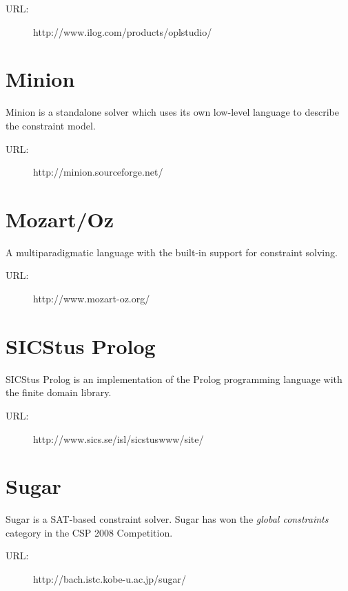 \begin{description}
	\item[URL:] http://www.ilog.com/products/oplstudio/
\end{description}

\section*{Minion}
Minion is a standalone solver which uses its own low-level language to describe the
constraint model. 

\begin{description}
	\item[URL:] http://minion.sourceforge.net/
\end{description}  

\section*{Mozart/Oz}
A multiparadigmatic language with the built-in support for constraint solving.

\begin{description}
	\item[URL:] http://www.mozart-oz.org/
\end{description}  

\section*{SICStus Prolog}
SICStus Prolog is an implementation of the Prolog programming language with the 
finite domain library.

\begin{description}
	\item[URL:] http://www.sics.se/isl/sicstuswww/site/
\end{description}  

\section*{Sugar}
Sugar is a SAT-based constraint solver. Sugar has won the {\em global constraints} category
in the CSP 2008 Competition.

\begin{description}
	\item[URL:] http://bach.istc.kobe-u.ac.jp/sugar/
\end{description}  